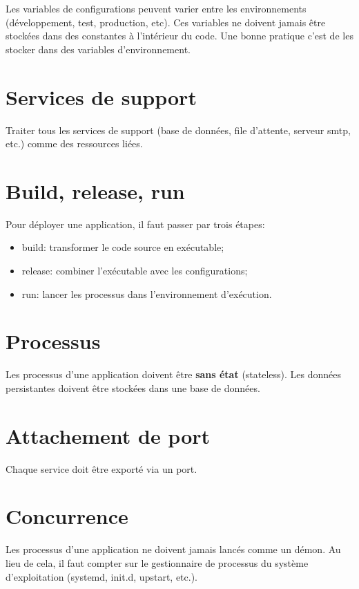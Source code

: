 Les variables de configurations peuvent varier entre les environnements (développement, test, production, etc). Ces variables ne doivent jamais être stockées dans des constantes à l'intérieur du code. Une bonne pratique c'est de les stocker dans des variables d'environnement.

\section*{Services de support}

Traiter tous les services de support (base de données, file d'attente, serveur \acrshort{smtp}, etc.)  comme des ressources liées.

\section*{Build, release, run}

Pour déployer une application, il faut passer par trois étapes:
\begin{itemize}
	\item build: transformer le code source en exécutable;
	\item release: combiner l'exécutable avec les configurations;
	\item run: lancer les processus dans l'environnement d'exécution.
\end{itemize}


\section*{Processus}

Les processus d'une application doivent être \textbf{sans état} (stateless). Les données persistantes doivent être stockées dans une base de données.

\section*{Attachement de port}

Chaque service doit être exporté via un port.

\section*{Concurrence}

Les processus d'une application ne doivent jamais lancés comme un démon. Au lieu de cela, il faut compter sur le gestionnaire de processus du système d'exploitation (systemd, init.d, upstart, etc.).

